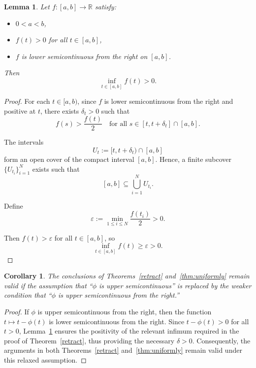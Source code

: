 \documentclass{birkjour}
\newtheorem{cor}[thm]{Corollary}
\newtheorem{lem}[thm]{Lemma}
\theoremstyle{definition}
\theoremstyle{remark}
\numberwithin{equation}{section}
\begin{document}

\begin{lem}\label{lem:rusc}
Let \(f : [a,b] \to \mathbb{R}\) satisfy:
\begin{itemize}
    \item \(0 < a < b\),
    \item \(f(t) > 0\) for all \(t \in [a,b]\),
    \item \(f\) is lower semicontinuous from the right on \([a,b]\).
\end{itemize}
Then
\[
\inf_{t \in [a,b]} f(t) > 0.
\]
\end{lem}

\begin{proof}
For each \(t \in [a,b)\), since \(f\) is lower semicontinuous from the right and positive at \(t\), there exists \(\delta_t > 0\) such that
\[
f(s) > \frac{f(t)}{2} \quad \text{for all } s \in [t, t + \delta_t] \cap [a,b].
\]

The intervals
\[
U_t := [t, t + \delta_t) \cap [a,b]
\]
form an open cover of the compact interval \([a,b]\). Hence, a finite subcover \(\{U_{t_i}\}_{i=1}^N\) exists such that
\[
[a,b] \subseteq \bigcup_{i=1}^N U_{t_i}.
\]

Define
\[
\varepsilon := \min_{1 \leq i \leq N} \frac{f(t_i)}{2} > 0.
\]

Then \(f(t) > \varepsilon\) for all \(t \in [a,b]\), so
\[
\inf_{t \in [a,b]} f(t) \geq \varepsilon > 0.
\]
\end{proof}


\begin{cor}\label{uniform_convergence}
The conclusions of Theorems~\ref{retract} and~\ref{thm:uniformly} remain valid if the assumption that “\(\phi\) is upper semicontinuous” is replaced by the weaker condition that “\(\phi\) is upper semicontinuous from the right.”
\end{cor}

\begin{proof}
If \(\phi\) is upper semicontinuous from the right, then the function \(t \mapsto t - \phi(t)\) is lower semicontinuous from the right. Since \(t - \phi(t) > 0\) for all \(t > 0\), Lemma~\ref{lem:rusc} ensures the positivity of the relevant infimum required in the proof of Theorem~\ref{retract}, thus providing the necessary \(\delta > 0\). Consequently, the arguments in both Theorems~\ref{retract} and~\ref{thm:uniformly} remain valid under this relaxed assumption.
\end{proof}
\end{document}

